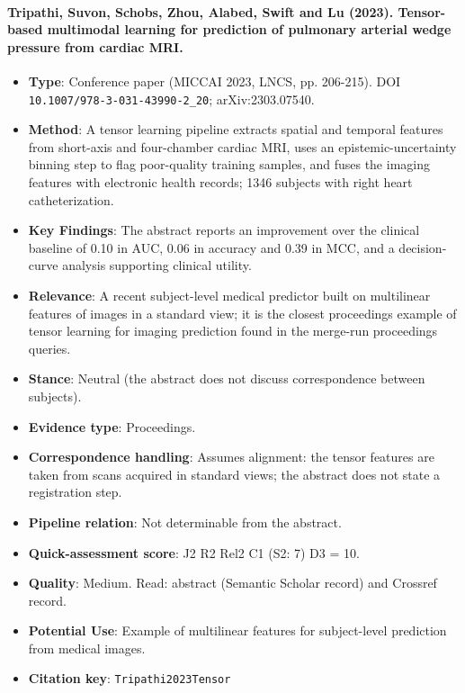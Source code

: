 \documentclass[journal,onecolumn]{IEEEtran}
\begin{document}
\paragraph{Tripathi, Suvon, Schobs, Zhou, Alabed, Swift and Lu (2023). Tensor-based multimodal learning for prediction of pulmonary arterial wedge pressure from cardiac MRI.~\cite{Tripathi2023Tensor}}\mbox{}

\begin{itemize}

\item{} \textbf{Type}: Conference paper (MICCAI 2023, LNCS, pp. 206-215). DOI \nolinkurl{10.1007/978-3-031-43990-2_20}; arXiv:2303.07540.

\item{} \textbf{Method}: A tensor learning pipeline extracts spatial and temporal features from short-axis and four-chamber cardiac MRI, uses an epistemic-uncertainty binning step to flag poor-quality training samples, and fuses the imaging features with electronic health records; 1346 subjects with right heart catheterization.

\item{} \textbf{Key Findings}: The abstract reports an improvement over the clinical baseline of 0.10 in AUC, 0.06 in accuracy and 0.39 in MCC, and a decision-curve analysis supporting clinical utility.

\item{} \textbf{Relevance}: A recent subject-level medical predictor built on multilinear features of images in a standard view; it is the closest proceedings example of tensor learning for imaging prediction found in the merge-run proceedings queries.

\item{} \textbf{Stance}: Neutral (the abstract does not discuss correspondence between subjects).

\item{} \textbf{Evidence type}: Proceedings.

\item{} \textbf{Correspondence handling}: Assumes alignment: the tensor features are taken from scans acquired in standard views; the abstract does not state a registration step.

\item{} \textbf{Pipeline relation}: Not determinable from the abstract.

\item{} \textbf{Quick-assessment score}: J2 R2 Rel2 C1 (S2: 7) D3 = 10.

\item{} \textbf{Quality}: Medium. Read: abstract (Semantic Scholar record) and Crossref record.

\item{} \textbf{Potential Use}: Example of multilinear features for subject-level prediction from medical images.

\item{} \textbf{Citation key}: \texttt{Tripathi2023Tensor}

\end{itemize}
\end{document}
